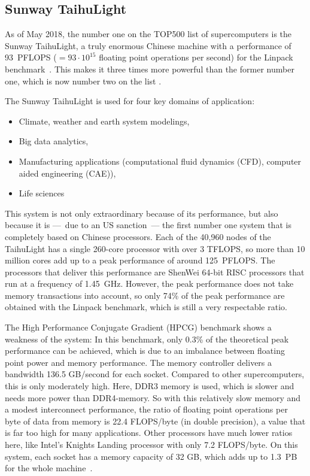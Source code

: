 \subsection{Sunway TaihuLight}
As of May 2018, the number one on the TOP500 list of supercomputers is the Sunway TaihuLight, a truly enormous Chinese machine with a performance of 93~PFLOPS ($= 93\cdot 10^{15}$ floating point operations per second) for the Linpack benchmark~\cite{fu2016sunway}. This makes it three times more powerful than the former number one, which is now number two on the list  \cite{top500sunway}. 

The Sunway TaihuLight is used for four key domains of application:
\begin{itemize}
\item Climate, weather and earth system modelings,
\item Big data analytics,
\item Manufacturing applications (computational fluid dynamics (CFD), computer aided engineering (CAE)),
\item Life sciences
\end{itemize}

This system is not only extraordinary because of its performance, but also because it is ---~due to an US sanction~--- the first number one system that is completely based on Chinese processors. Each of the 40,960 nodes of the TaihuLight has a single 260-core processor with over 3 TFLOPS, so more than 10 million cores add up to a peak performance of around 125~PFLOPS. The processors that deliver this performance are ShenWei 64-bit RISC processors that run at a frequency of 1.45~GHz. However, the peak performance does not take memory transactions into account, so only 74\% of the peak performance are obtained with the Linpack benchmark, which is still a very respectable ratio. 

The High Performance Conjugate Gradient (HPCG) benchmark shows a weakness of the system: In this benchmark, only 0.3\% of the theoretical peak performance can be achieved, which is due to an imbalance between floating point power and memory performance. The memory controller delivers a bandwidth 136.5 GB/second for each socket. Compared to other supercomputers, this is only moderately high. Here, DDR3 memory is used, which is slower and needs more power than DDR4-memory. So with this relatively slow memory and a modest interconnect performance, the ratio of floating point operations per byte of data from memory is 22.4 FLOPS/byte (in double precision), a value that is far too high for many applications. Other processors have much lower ratios here, like Intel's Knights Landing processor with only 7.2 FLOPS/byte. On this system, each socket has a memory capacity of 32 GB, which adds up to 1.3~PB for the whole machine~\cite{fu2016sunway, dongarra2016report}.


